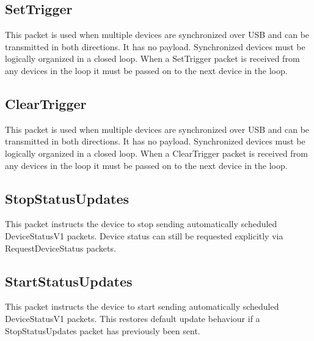 \documentclass[a4paper,11pt]{article}
\begin{document}
\subsection{SetTrigger}
This packet is used when multiple devices are synchronized over USB and can be transmitted in both directions. It has no payload. Synchronized devices must be logically organized in a closed loop. When a SetTrigger packet is received from any devices in the loop it must be passed on to the next device in the loop.

\subsection{ClearTrigger}
This packet is used when multiple devices are synchronized over USB and can be transmitted in both directions. It has no payload. Synchronized devices must be logically organized in a closed loop. When a ClearTrigger packet is received from any devices in the loop it must be passed on to the next device in the loop.

\subsection{StopStatusUpdates}
This packet instructs the device to stop sending automatically scheduled DeviceStatusV1 packets. Device status can still be requested explicitly via RequestDeviceStatus packets.

\subsection{StartStatusUpdates}
This packet instructs the device to start sending automatically scheduled DeviceStatusV1 packets. This restores default update behaviour if a StopStatusUpdates packet has previously been sent.
\end{document}
